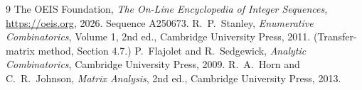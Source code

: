 \documentclass[11pt,a4paper]{article}
\theoremstyle{plain}
\theoremstyle{definition}
\begin{document}
\begin{thebibliography}{9}
 The OEIS Foundation, \emph{The On-Line Encyclopedia of Integer
Sequences}, \url{https://oeis.org}, 2026. Sequence A250673.
 R.~P.~Stanley, \emph{Enumerative Combinatorics}, Volume 1, 2nd ed.,
Cambridge University Press, 2011. (Transfer-matrix method, Section 4.7.)
 P.~Flajolet and R.~Sedgewick, \emph{Analytic Combinatorics}, Cambridge
University Press, 2009.
 R.~A.~Horn and C.~R.~Johnson, \emph{Matrix Analysis}, 2nd ed., Cambridge
University Press, 2013.
\end{thebibliography}
\end{document}
